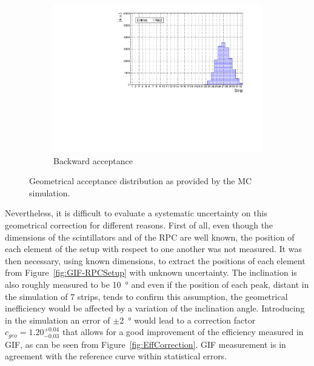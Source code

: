 \begin{figure}[H]
\begin{subfigure}{0.5\linewidth}
			\includegraphics[width = 0.7\plotwidth]{fig/chapt5/Geometrical-acceptance-backward.pdf}
			\caption{\label{fig:SimResult:C} Backward acceptance}
		\end{subfigure}
		\caption{\label{fig:SimResult} Geometrical acceptance distribution as provided by the \acl{MC} simulation.}
	\end{figure}
	
	Nevertheless, it is difficult to evaluate a systematic uncertainty on this geometrical correction for different reasons. First of all, even though the dimensions of the scintillators and of the RPC are well known, the position of each element of the setup with respect to one another was not measured. It was then necessary, using known dimensions, to extract the positions of each element from Figure~\ref{fig:GIF-RPCSetup} with unknown uncertainty. The inclination is also roughly measured to be \SI{10}{\degree} and even if the position of each peak, distant in the simulation of 7 strips, tends to confirm this assumption, the geometrical inefficiency would be affected by a variation of the inclination angle. Introducing in the simulation an error of $\pm$\SI{2}{\degree} would lead to a correction factor $c_{geo} = 1.20^{+0.04}_{-0.03}$ that allows for a good improvement of the efficiency measured in GIF, as can be seen from Figure~\ref{fig:EffCorrection}. GIF measurement is in agreement with the reference curve within statistical errors.

